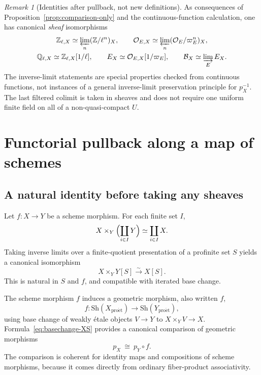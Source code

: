 \documentclass[11pt,a4paper]{article}
\numberwithin{equation}{section}
\theoremstyle{definition}
\theoremstyle{remark}
\newtheorem{remark}[theorem]{Remark}
\newcommand{\Sh}{\mathrm{Sh}}
\newcommand{\proet}{\mathrm{pro\acute{e}t}}
\newcommand{\OO}{\mathcal O}
\begin{document}
\begin{remark}[Identities after pullback, not new definitions]
As consequences of Proposition~\ref{prop:comparison-only} and the
continuous-function calculation, one has canonical \emph{sheaf}
isomorphisms
\[
\begin{gathered}
 \mathbb Z_{\ell,X}\simeq
    \varprojlim_n(\mathbb Z/\ell^n)_X,\qquad
 \OO_{E,X}\simeq
    \varprojlim_n(\OO_E/\varpi_E^n)_X,\\
 \mathbb Q_{\ell,X}\simeq\mathbb Z_{\ell,X}[1/\ell],\qquad
 E_X\simeq\OO_{E,X}[1/\varpi_E],\qquad
 \mathcal B_X\simeq\varinjlim_E E_X.
\end{gathered}
\]
The inverse-limit statements are special properties checked from
continuous functions, not instances of a general inverse-limit
preservation principle for $p_X^{-1}$.  The last filtered colimit is
taken in sheaves and does not require one uniform finite field on
all of a non-quasi-compact $U$.
\end{remark}

\section{Functorial pullback along a map of schemes}

\subsection{A natural identity before taking any sheaves}

Let $f:X\to Y$ be a scheme morphism.  For each finite set $I$,
\[
        X\times_Y\Bigl(\coprod_{i\in I}Y\Bigr)
                   \simeq\coprod_{i\in I}X.
\]
Taking inverse limits over a finite-quotient presentation of a
profinite set $S$ yields a canonical isomorphism
\begin{equation}\label{eq:basechange-XS}
               \boxed{\quad
                X\times_Y Y[S]\xrightarrow{\sim}X[S].\quad}
\end{equation}
This is natural in $S$ and $f$, and compatible with iterated base change.

The scheme morphism $f$ induces a geometric morphism, also written $f$,
\[
   f:\Sh(X_{\proet})\longrightarrow\Sh(Y_{\proet}),
\]
using base change of weakly \'{e}tale objects $V\to Y$ to
$X\times_Y V\to X$.  Formula~\eqref{eq:basechange-XS} provides a
canonical comparison of geometric morphisms
\begin{equation}\label{eq:triangle}
        p_X\ \cong\ p_Y\circ f.
\end{equation}
The comparison is coherent for identity maps and compositions of
scheme morphisms, because it comes directly from ordinary fiber-product
associativity.
\end{document}

